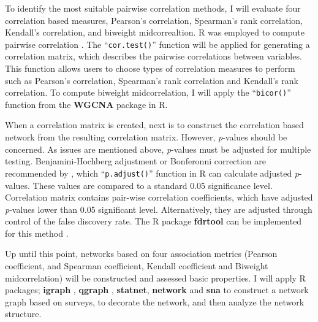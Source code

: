 To identify the most suitable pairwise correlation methods, I will evaluate four correlation based measures, Pearson's correlation, Spearman's rank correlation, Kendall's correlation, and biweight midcorrealtion. R was employed to compute pairwise correlation . The ``\texttt{cor.test()}'' function will be applied for generating a correlation matrix, which describes the pairwise correlations between variables. This function allows users to choose types of correlation measures to perform such as Pearson's correlation, Spearman's rank correlation and Kendall's rank correlation. To compute biweight midcorrelation, I will apply the ``\texttt{bicor()}'' function from the \textbf{WGCNA} package  in R. 

When a correlation matrix is created, next is to construct the correlation based network from the resulting correlation matrix. However, \textit{p}-values should be concerned. As issues are mentioned above, \textit{p}-values must be adjusted for multiple testing. Benjamini-Hochberg adjustment or Bonferonni correction are recommended by , which ``\texttt{p.adjust()}'' function in R can calculate adjusted \textit{p}-values. These values are compared to a standard 0.05 significance level. Correlation matrix contains pair-wise correlation coefficients, which have adjusted \textit{p}-values lower than 0.05 significant level. Alternatively, they are adjusted through control of the false discovery rate. The R package \textbf{fdrtool} can be implemented for this method .

Up until this point, networks based on four association metrics (Pearson coefficient, and Spearman coefficient, Kendall coefficient and Biweight midcorrelation) will be constructed and assessed basic properties. I will apply R packages; \textbf{igraph} , \textbf{qgraph} , \textbf{statnet}, \textbf{network}  and \textbf{sna} to construct a network graph based on surveys, to decorate the network, and then analyze the network structure.

